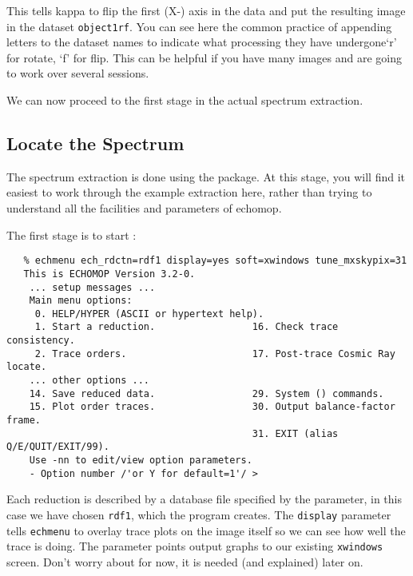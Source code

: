 This tells {\sc kappa} to flip the first (X-) axis in the data and put
the resulting image in the dataset \verb+object1rf+\@.
You can see here the common practice of appending letters to the
dataset names to indicate what processing they have
undergone\scspec{---}{ - }`r' for rotate, `f' for flip.
This can be helpful if you have many images and are going to work
over several sessions.

We can now proceed to the first stage in the actual spectrum extraction.


\subsection{Locate the Spectrum}

The spectrum extraction is done using the 
package.  At this stage, you will find it easiest to work through the
example extraction here, rather than trying to understand all the
facilities and parameters of {\sc echomop}.

The first stage is to start :

{
\scspec{\small}{ }
\begin{verbatim}
   % echmenu ech_rdctn=rdf1 display=yes soft=xwindows tune_mxskypix=31
   This is ECHOMOP Version 3.2-0.
    ... setup messages ...
    Main menu options:
     0. HELP/HYPER (ASCII or hypertext help).
     1. Start a reduction.                 16. Check trace consistency.
     2. Trace orders.                      17. Post-trace Cosmic Ray locate.
    ... other options ...
    14. Save reduced data.                 29. System () commands.
    15. Plot order traces.                 30. Output balance-factor frame.
                                           31. EXIT (alias Q/E/QUIT/EXIT/99).
    Use -nn to edit/view option parameters.
    - Option number /'or Y for default=1'/ >
\end{verbatim}
}

Each reduction is described by a database file specified by the
 parameter,
in this case we have chosen \verb+rdf1+, which the program creates.
The \verb+display+ parameter tells \verb+echmenu+ to overlay trace
plots  on the image itself so we can see how well the trace is doing.
The  parameter points output
graphs to our existing \verb+xwindows+ screen.
Don't worry about 
for now, it is needed (and explained) later on.

